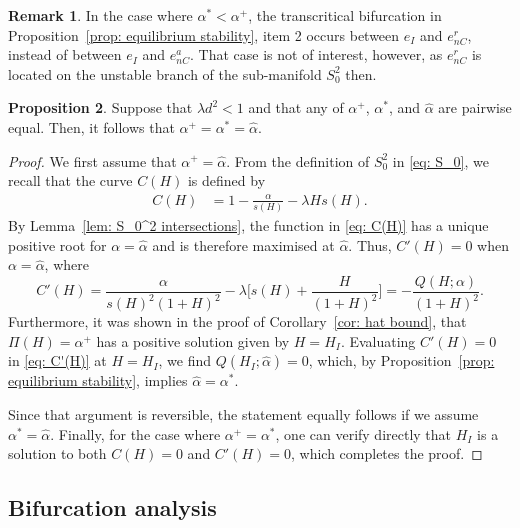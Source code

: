 \documentclass{article}
\theoremstyle{definition}
\numberwithin{equation}{section}
\newtheorem{prop}{Proposition}
\newtheorem{remark}[prop]{Remark}
\begin{document}
\begin{remark}
    In the case where $\alpha^\ast<\alpha^{+}$, the transcritical bifurcation in Proposition~\ref{prop: equilibrium stability}, item 2 occurs between $e_{I}$ and $e_{nC}^{r}$, instead of between $e_{I}$ and $e_{nC}^a$. That case is not of interest, however, as $e_{nC}^r$ is located on the unstable branch of the sub-manifold $S_0^2$ then.
\end{remark}
\begin{prop}Suppose that  $\lambda d^2<1$ and that any of $\alpha^{+}$, $\alpha^\ast$, and $\hat\alpha$ are pairwise equal. Then, it follows that $\alpha^{+}=\alpha^\ast=\hat\alpha$.
\label{Prop: alpha equality}
\end{prop}
\begin{proof}
We first assume that $\alpha^{+}=\hat\alpha$. From the definition of $S_0^2$ in \eqref{eq: S_0}, we recall that the curve $C(H)$ is defined by
\begin{align}
    C(H) &= 1-\frac{\alpha}{s(H)}-\lambda Hs(H). 
    \label{eq: C(H)}
\end{align}
By Lemma~\ref{lem: S_0^2 intersections}, the function in \eqref{eq: C(H)} has a unique positive root for $\alpha=\hat{\alpha}$ and is therefore maximised at $\hat{\alpha}$. Thus, $C'(H)=0$ when $\alpha=\hat{\alpha}$, where 
\begin{equation}
    C'(H) = \frac{\alpha}{s(H)^2(1+H)^2}-\lambda\bigg[s(H)+\frac{H}{(1+H)^2}\bigg] = -\frac{Q(H;\alpha)}{(1+H)^2}.
    \label{eq: C'(H)}
\end{equation}
Furthermore, it was shown in the proof of Corollary~\ref{cor: hat bound}, that $\Pi(H)=\alpha^+$ has a positive solution given by $H=H_I$. Evaluating $C'(H)=0$ in \eqref{eq: C'(H)} at $H=H_I$, we find $Q(H_I;\hat\alpha)=0$, which, by Proposition~\ref{prop: equilibrium stability}, implies $\hat\alpha=\alpha^\ast$.


Since that argument is reversible, the statement equally follows if we assume $\alpha^\ast=\hat\alpha$. Finally, for the case where $\alpha^+=\alpha^\ast$, one can verify directly that $H_{I}$ is a solution to both $C(H)=0$ and $C'(H)=0$, which completes the proof.
\end{proof}

\subsection{Bifurcation analysis}
\end{document}
